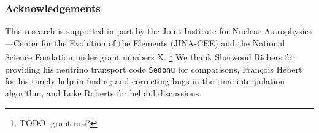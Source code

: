 \documentclass[aps,floatfix,prd,superscriptaddress,twocolumn]{revtex4-1}
\begin{document}
\subsubsection*{Acknowledgements}
This research is supported in part by the Joint Institute for Nuclear
Astrophysics---Center for the Evolution of the Elements (JINA-CEE)
and the National Science Fondation under grant numbers X. \footnote{TODO: grant nos?}
We thank Sherwood Richers for providing his neutrino transport code
\lstinline{Sedonu} for comparisons,
Fran\c{c}ois H\'{e}bert for his timely help in finding and
correcting bugs in the time-interpolation algorithm,
and Luke Roberts for helpful discussions.


\end{document}
